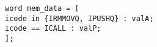 \documentclass{article}
\begin{document}
\texttt{word mem\_data = [ \\
\hspace*{17mm} icode in \{IRMMOVQ, IPUSHQ\} : valA; \\
\hspace*{17mm} icode == ICALL : valP; \\
\hspace*{5mm}];}
\end{document}
